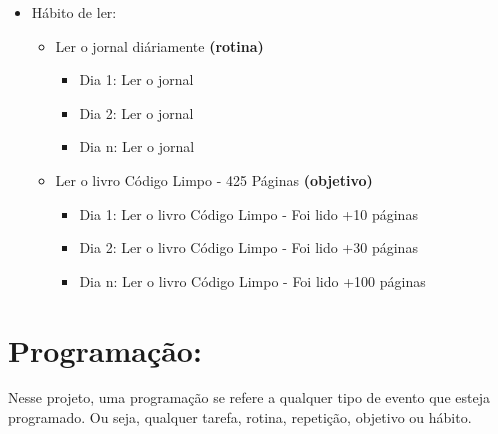 \begin{itemize}
  \item{Hábito de ler:}
  \begin{itemize}
    \item{Ler o jornal diáriamente \textbf{(rotina)}}
    \begin{itemize}
      \item{Dia 1: Ler o jornal}
      \item{Dia 2: Ler o jornal}
      \item{Dia n: Ler o jornal}
    \end{itemize}
    \item{Ler o livro Código Limpo - 425 Páginas \textbf{(objetivo)}}
    \begin{itemize}
      \item{Dia 1: Ler o livro Código Limpo - Foi lido +10 páginas}
      \item{Dia 2: Ler o livro Código Limpo - Foi lido +30 páginas}
      \item{Dia n: Ler o livro Código Limpo - Foi lido +100 páginas}
    \end{itemize}

  \end{itemize}
\end{itemize}

\section{Programação:}

Nesse projeto, uma programação se refere a qualquer tipo de evento que esteja
programado. Ou seja, qualquer tarefa, rotina, repetição, objetivo ou hábito.

